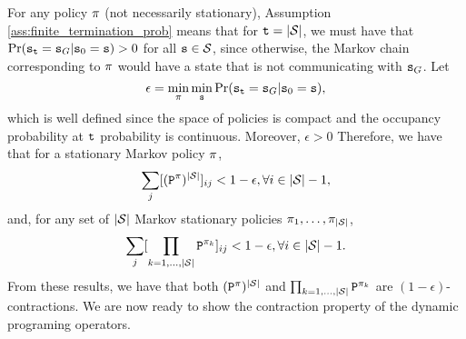 For any policy $\pi$ (not necessarily stationary), Assumption \ref{ass:finite_termination_prob} means that for ${\tt t}=|\mathcal{S}|$, we must have that $\Pr ({\tt s}_{{\tt t}} = {\tt s}_G | {\tt s}_0 = {\tt s}) > 0$ for all ${\tt s} \in \mathcal{S}$, since otherwise, the Markov chain corresponding to $\pi$ would have a state that is not communicating with ${\tt s}_G$. Let
\begin{equation*}
    \epsilon = \min_{\pi} \min_{{\tt s}} \Pr ({\tt s}_{{\tt t}} = {\tt s}_G | {\tt s}_0 = {\tt s}),
\end{equation*}
which is well defined since the space of policies is compact and the occupancy probability at ${\tt t}$ probability is continuous. Moreover, $\epsilon>0$
Therefore, we have that for a stationary Markov policy $\pi$,
\begin{equation}
    \sum_{j}[({\tt P}^\pi)^{|\mathcal{S}|}]_{ij} < 1-\epsilon, \forall i \in |\mathcal{S}|-1,
\end{equation}
and, for any set of $|\mathcal{S}|$ Markov stationary policies $\pi_1,\dots,\pi_{|\mathcal{S}|}$,
\begin{equation}
    \sum_{j}[\prod_{k=1,\dots,|\mathcal{S}|} {\tt P}^{\pi_k}]_{ij} < 1-\epsilon, \forall i \in |\mathcal{S}|-1.
\end{equation}
From these results, we have that both $({\tt P}^\pi)^{|\mathcal{S}|}$ and $\prod_{k=1,\dots,|\mathcal{S}|} {\tt P}^{\pi_k}$ are $(1-\epsilon)$-contractions.
We are now ready to show the contraction property of the dynamic programing operators.

